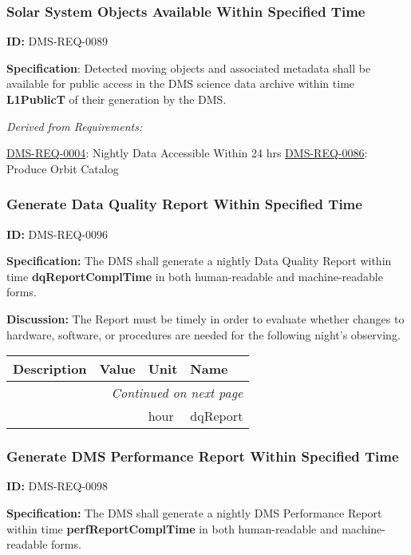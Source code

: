 \documentclass[SE,toc,lsstdraft]{lsstdoc}
\makeatletter
\newcommand{\paramname}[1]{\hspace{0pt}#1}
\newcommand{\unitname}[1]{\hspace{0pt}#1}
\newenvironment{parameters}[0]{%
\setlength\LTleft{0pt}
\setlength\LTright{\fill}
\begin{small}
\begin{longtable}[]{|p{0.5\textwidth}|l|p{0.6in}|p{1.74in}@{}|}

\hline \textbf{Description} & \textbf{Value} & \textbf{Unit} & \textbf{Name} \\ \hline
\endhead

\hline \multicolumn{4}{r}{\emph{Continued on next page}} \\
\endfoot

\hline\hline
\endlastfoot
}{%
\hline
\end{longtable}
\end{small}
}
\makeatother
\begin{document}
\subsubsection{Solar System Objects Available Within Specified Time}

\label{DMS-REQ-0089}
\textbf{ID:} DMS-REQ-0089

\textbf{Specification}: Detected moving objects and associated metadata shall be available for public access in the DMS science data archive within time \textbf{L1PublicT }of their generation by the DMS.






\emph{Derived from Requirements:}

\hyperref[DMS-REQ-0004]{DMS-REQ-0004}:
Nightly Data Accessible Within 24 hrs \newline
\hyperref[DMS-REQ-0086]{DMS-REQ-0086}:
Produce Orbit Catalog \newline


\subsubsection{Generate Data Quality Report Within Specified Time}

\label{DMS-REQ-0096}
\textbf{ID:} DMS-REQ-0096

\textbf{Specification:} The DMS shall generate a nightly Data Quality Report within time \textbf{dqReportComplTime }in both human-readable and machine-readable forms.

\textbf{Discussion:} The Report must be timely in order to evaluate whether changes to hardware, software, or procedures are needed for the following night's observing.



\begin{parameters}

&

&
\unitname{%
hour
}
&
\paramname{%
dqReport
} \\\hline
\end{parameters}




\subsubsection{Generate DMS Performance Report Within Specified Time}

\label{DMS-REQ-0098}
\textbf{ID:} DMS-REQ-0098

\textbf{Specification:} The DMS shall generate a nightly DMS Performance Report within time \textbf{perfReportComplTime }in both human-readable and machine-readable forms.
\end{document}
